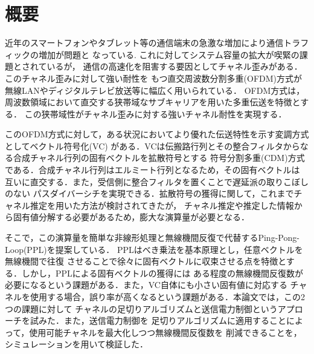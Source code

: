 \chapter*{概要} %
\thispagestyle{empty}

\thispagestyle{empty}
近年のスマートフォンやタブレット等の通信端末の急激な増加により通信トラフィックの増加が問題と
なっている.
これに対してシステム容量の拡大が喫緊の課題とされているが，
通信の高速化を阻害する要因としてチャネル歪みがある．このチャネル歪みに対して強い耐性を
もつ直交周波数分割多重(OFDM)方式が無線LANやディジタルテレビ放送等に幅広く用いられている．
OFDM方式は，周波数領域において直交する狭帯域なサブキャリアを用いた多重伝送を特徴とする．
この狭帯域性がチャネル歪みに対する強いチャネル耐性を実現する．

このOFDM方式に対して，ある状況においてより優れた伝送特性を示す変調方式としてベクトル符号化(VC)
がある．VCは伝搬路行列とその整合フィルタからなる合成チャネル行列の固有ベクトルを拡散符号とする
符号分割多重(CDM)方式である．合成チャネル行列はエルミート行列となるため，その固有ベクトルは
互いに直交する．また，受信側に整合フィルタを置くことで遅延派の取りこぼしのない
パスダイバーシチを実現できる．拡散符号の獲得に関して，これまでチャネル推定を用いた方法が検討されてきたが，
チャネル推定や推定した情報から固有値分解する必要があるため，膨大な演算量が必要となる．

そこで，この演算量を簡単な非線形処理と無線機間反復で代替するPing-Pong-Loop(PPL)を提案している．
PPLはべき乗法を基本原理とし，任意ベクトルを無線機間で往復
させることで徐々に固有ベクトルに収束させる点を特徴とする．しかし，PPLによる固有ベクトルの獲得には
ある程度の無線機間反復数が必要になるという課題がある．また，VC自体にも小さい固有値に対応する
チャネルを使用する場合，誤り率が高くなるという課題がある．本論文では，この2つの課題に対して
チャネルの足切りアルゴリズムと送信電力制御というアプローチを試みた．また，送信電力制御を
足切りアルゴリズムに適用することによって，使用可能チャネルを最大化しつつ無線機間反復数を
削減できることを，シミュレーションを用いて検証した．